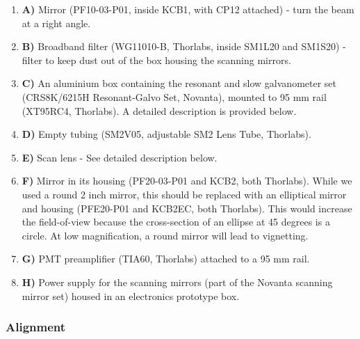 \documentclass[10pt,letterpaper]{article}
\begin{document}
\begin{enumerate}[]
    \item \textbf{A)} Mirror (PF10-03-P01, inside KCB1, with CP12 attached) - turn the beam at a right angle.
    \item \textbf{B)} Broadband filter (WG11010-B, Thorlabs, inside SM1L20 and SM1S20) - filter to keep dust out of the box housing the scanning mirrors.
    \item \textbf{C)} An aluminium box containing the resonant and slow galvanometer set (CRS8K/6215H Resonant-Galvo Set, Novanta), mounted to 95 mm rail (XT95RC4, Thorlabs). A detailed description is provided below.
    \item \textbf{D)} Empty tubing (SM2V05, adjustable SM2 Lens Tube, Thorlabs).
    \item \textbf{E)} Scan lens - See detailed description below.
    \item \textbf{F)} Mirror in its housing (PF20-03-P01 and KCB2, both Thorlabs). While we used a round 2 inch mirror, this should be replaced with an elliptical mirror and housing (PFE20-P01 and KCB2EC, both Thorlabs). This would increase the field-of-view because the cross-section of an ellipse at 45 degrees is a circle. At low magnification, a round mirror will lead to vignetting.
    \item \textbf{G)} PMT preamplifier (TIA60, Thorlabs) attached to a 95 mm rail.
    \item \textbf{H)} Power supply for the scanning mirrors (part of the Novanta scanning mirror set) housed in an electronics prototype box.
\end{enumerate}

\subsubsection{Alignment}
\end{document}
